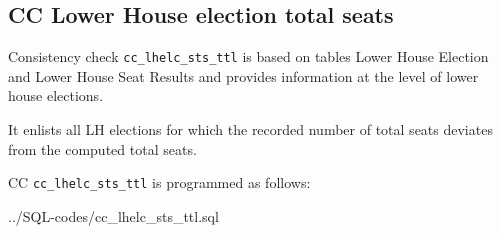 \subsection{CC Lower House election total seats}\label{cc_lhelc_sts_ttl}
Consistency check \texttt{\footnotesize cc\_lhelc\_sts\_ttl} is based on tables Lower House Election and Lower House Seat Results and provides information at the level of lower house elections.

It enlists all LH elections for which the recorded number of total seats deviates from the computed total seats.

CC \texttt{\footnotesize cc\_lhelc\_sts\_ttl} is programmed as follows:

%
{../SQL-codes/cc_lhelc_sts_ttl.sql}
